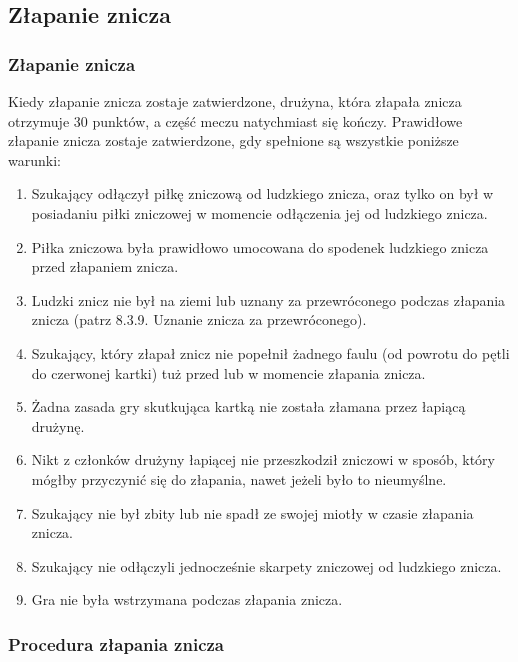 \documentclass[12pt]{article}
\begin{document}
\subsection{Złapanie znicza}

\subsubsection{Złapanie znicza}

Kiedy złapanie znicza zostaje zatwierdzone, drużyna, która złapała
znicza otrzymuje 30 punktów, a część meczu natychmiast się kończy.
Prawidłowe złapanie znicza zostaje zatwierdzone, gdy spełnione są
wszystkie poniższe warunki:

\begin{enumerate}
\item
  Szukający odłączył piłkę zniczową od ludzkiego znicza, oraz tylko on
  był w posiadaniu piłki zniczowej w momencie odłączenia jej od
  ludzkiego znicza.
\item
  Piłka zniczowa była prawidłowo umocowana do spodenek ludzkiego znicza
  przed złapaniem znicza.
\item
  Ludzki znicz nie był na ziemi lub uznany za przewróconego podczas
  złapania znicza (patrz 8.3.9. Uznanie znicza za przewróconego).
\item
  Szukający, który złapał znicz nie popełnił żadnego faulu (od powrotu
  do pętli do czerwonej kartki) tuż przed lub w momencie złapania
  znicza.
\item
  Żadna zasada gry skutkująca kartką nie została złamana przez łapiącą
  drużynę.
\item
  Nikt z członków drużyny łapiącej nie przeszkodził zniczowi w sposób,
  który mógłby przyczynić się do złapania, nawet jeżeli było to
  nieumyślne.
\item
  Szukający nie był zbity lub nie spadł ze swojej miotły w czasie
  złapania znicza.
\item
  Szukający nie odłączyli jednocześnie skarpety zniczowej od ludzkiego
  znicza.
\item
  Gra nie była wstrzymana podczas złapania znicza.
\end{enumerate}

\subsubsection{Procedura złapania znicza}
\end{document}
